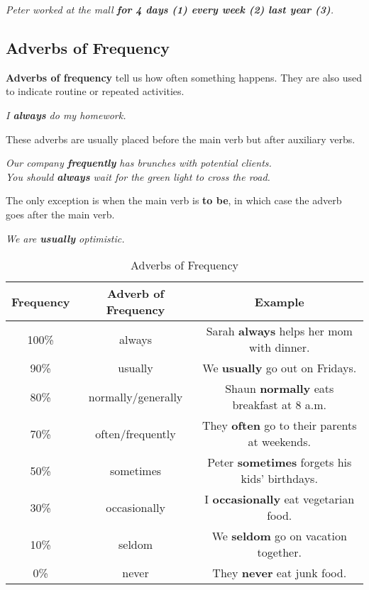 \documentclass[hidelinks,10pt,a4paper]{article}
\begin{document}
\begin{center}
	\textit{Peter worked at the mall \textbf{for 4 days (1) every week (2) last year (3)}. }
\end{center}

\subsection{Adverbs of Frequency}
\textbf{Adverbs of frequency} tell us how often something happens. They are also used to indicate routine or repeated activities.

\begin{center}
	\textit{I \textbf{always} do my homework.}
\end{center}

These adverbs are usually placed before the main verb but after auxiliary verbs.

\begin{center}
	\textit{Our company \textbf{frequently} has brunches with potential clients. \\
	You should \textbf{always} wait for the green light to cross the road.}
\end{center}

The only exception is when the main verb is \textbf{to be}, in which case the adverb goes after the main verb.

\begin{center}
	\textit{We are \textbf{usually} optimistic.}
\end{center}

\begin{table}[h]
\begin{center}
\begin{tabular}{|c|c|c|}
	\hline
	\textbf{Frequency} & \textbf{Adverb of Frequency} & \textbf{Example} \\ \hline
	100\% & always & Sarah \textbf{always} helps her mom with dinner. \\ \hline
	90\% & usually & We \textbf{usually} go out on Fridays. \\ \hline
	80\% & normally/generally & Shaun \textbf{normally} eats breakfast at 8 a.m. \\ \hline
	70\% & often/frequently & They \textbf{often} go to their parents at weekends. \\ \hline
	50\% & sometimes & Peter \textbf{sometimes} forgets his kids' birthdays. \\ \hline
	30\% & occasionally & I \textbf{occasionally} eat vegetarian food. \\ \hline
	10\% & seldom & We \textbf{seldom} go on vacation together. \\ \hline
	0\% & never & They \textbf{never} eat junk food. \\ \hline
\end{tabular}
\end{center}
\caption{Adverbs of Frequency} \label{tab:af1}
\end{table}
\end{document}
